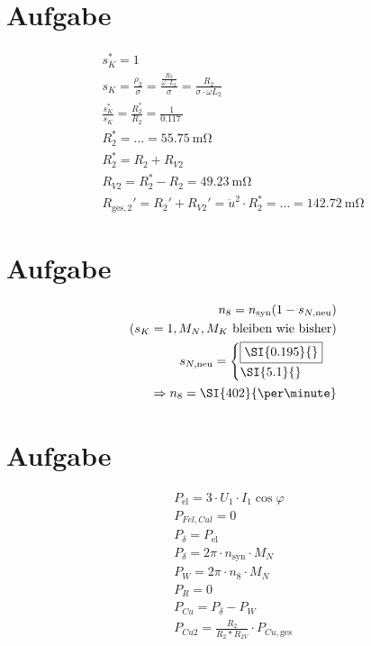 \documentclass[10pt,a4paper]{article}
\begin{document}
\section{Aufgabe}
\begin{align*}
s_K^* = 1\\
s_K = \frac{\rho_2}{\sigma} = \frac{\frac{R_2}{\omega\cdot L_2}}{\sigma} = \frac{R_2}{\sigma \cdot \omega L_2}\\
\frac{s_K^*}{s_K} = \frac{R_2^*}{R_2} = \frac{1}{\SI{0.117}{}}\\
R_2^* = \ldots = \SI{55.75}{\milli\ohm}\\
R_2^* = R_2 + R_{V2}\\
R_{V2} = R_2^* - R_2 = \SI{49.23}{\milli\ohm}\\
R_{\text{ges},2}' = R_2' + R_{V2}' = \ddot{u}^2 \cdot R_2^* = \ldots = \SI{142.72}{\milli\ohm}
\end{align*}

\section{Aufgabe}
\begin{align*}
n_8 = n_\text{syn} (1 - s_{N,\text{neu}})\\
(s_K=1, M_N, M_K\ \text{bleiben wie bisher})\\
s_{N,\text{neu}} = \begin{cases}\fbox{$\SI{0.195}{}$}\\ \SI{5.1}{} \end{cases}\\
\Rightarrow n_8 = \SI{402}{\per\minute}
\end{align*}

\section{Aufgabe}
\begin{align*}
P_\text{el} = 3 \cdot U_1 \cdot I_1 \cos \varphi\\
P_{Fel, Cul} = 0\\
P_\delta = P_\text{el}\\
P_\delta = 2\pi \cdot n_\text{syn} \cdot M_N\\
P_W = 2\pi \cdot n_8 \cdot M_N\\
P_R = 0\\
P_{Cu} = P_\delta - P_W\\
P_{Cu2} = \frac{R_2}{R_2 * R_{2V}} \cdot P_{Cu, \text{ges}}
\end{align*}
\end{document}
